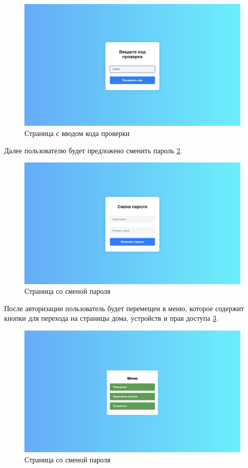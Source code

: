 \begin{figure}[H]
    \includegraphics[width=1\linewidth]{img/code.png}
    \caption{\label{img:code} Страница с вводом кода проверки}
\end{figure}
\noindent

Далее пользователю будет предложено сменить пароль \ref{img:smena}.

\begin{figure}[H]
    \includegraphics[width=1\linewidth]{img/smena.png}
    \caption{\label{img:smena} Страница со сменой пароля}
\end{figure}
\noindent

После авторизации пользователь будет перемещен в меню, которое содержит кнопки для перехода на 
страницы дома, устройств и прав доступа \ref{img:menu}.

\begin{figure}[H]
    \includegraphics[width=1\linewidth]{img/menu.png}
    \caption{\label{img:menu} Страница со сменой пароля}
\end{figure}
\noindent

